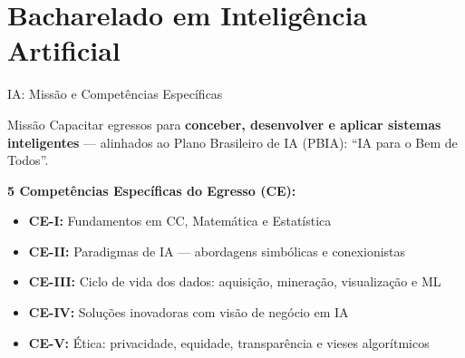 \documentclass[aspectratio=169]{beamer}
\newcommand{\impt}[1]{\textcolor{morange}{\textbf{#1}}}
\begin{document}
\section{Bacharelado em Inteligência Artificial}

\begin{frame}{IA: Missão e Competências Específicas}
  \begin{block}{Missão}
    Capacitar egressos para \impt{conceber, desenvolver e aplicar sistemas inteligentes} --- alinhados ao Plano Brasileiro de IA (PBIA): \enquote{IA para o Bem de Todos}.
  \end{block}
  \vspace{0.15cm}
  \textbf{5 Competências Específicas do Egresso (CE):}
  \begin{itemize}\setlength\itemsep{3pt}
    \item \textbf{CE-I:} Fundamentos em CC, Matemática e Estatística
    \item \textbf{CE-II:} Paradigmas de IA --- abordagens simbólicas e conexionistas
    \item \textbf{CE-III:} Ciclo de vida dos dados: aquisição, mineração, visualização e ML
    \item \textbf{CE-IV:} Soluções inovadoras com visão de negócio em IA
    \item \textbf{CE-V:} Ética: privacidade, equidade, transparência e vieses algorítmicos
  \end{itemize}
\end{frame}
\end{document}
